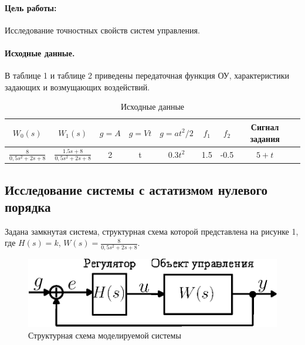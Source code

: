 \documentclass[a4paper,12pt]{article} %
\begin{document}


\paragraph{Цель работы:}Исследование точностных свойств систем управления.%
\paragraph{Исходные данные.} В таблице 1 и таблице 2 приведены передаточная функция ОУ, характеристики задающих и возмущающих воздействий.
\begin{table}[h!]
	\caption{Исходные данные}
	\renewcommand{\arraystretch}{1.8} %
	\begin{tabular}{|c|c|c|c|c|c|c|c|c|}
		\hline $W_0(s)$ & $W_1(s)$ & $g = A$ & $g = Vt$ & $g = at^2/2$ &  $f_1$ & $f_2$ & Сигнал задания\\
		\hline $\displaystyle{\frac{8}{0,5s^2+2s + 8}}$& $\displaystyle{\frac{1.5s+8}{0,5s^2+2s+8}}$ & 2 & t & $0.3t^2$ & 1.5 & -0.5 & $5+t$\\
		\hline
	\end{tabular}	
\end{table}

\newpage
\begin{center}
\section{Исследование системы с астатизмом нулевого порядка}
\end{center}
\par Задана замкнутая система, структурная схема которой представлена на рисунке 1, где $H(s) = k$, $W(s)=\displaystyle{\frac{8}{0,5s^2+2s + 8}}$.
\begin{figure}[h!]
	\centering
	\includegraphics[width=0.5\linewidth]{scheme/scheme0.eps}
	\caption{Структурная схема моделируемой системы}
\end{figure}
\end{document}
